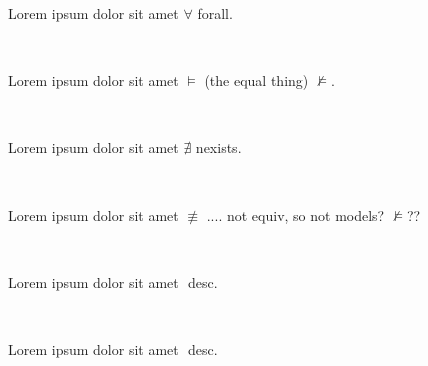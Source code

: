 \documentclass[12pt]{article}
\begin{document}
Lorem ipsum dolor sit amet $ \forall $ forall.

\centerline{~}

Lorem ipsum dolor sit amet $ \models $ (the equal thing) $ \nvDash $.

\centerline{~}

Lorem ipsum dolor sit amet $ \nexists $ nexists.

\centerline{~}

Lorem ipsum dolor sit amet $ \not\equiv $ .... not equiv, so not models? $ \not\models $??

\centerline{~}

Lorem ipsum dolor sit amet $  $ desc.

\centerline{~}

Lorem ipsum dolor sit amet $  $ desc.

\centerline{~}
\end{document}
